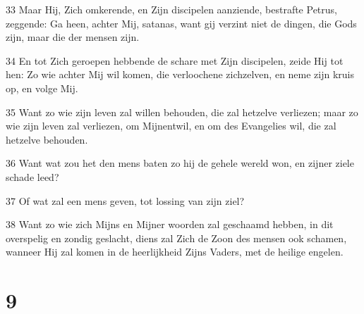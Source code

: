\par 33 Maar Hij, Zich omkerende, en Zijn discipelen aanziende, bestrafte Petrus, zeggende: Ga heen, achter Mij, satanas, want gij verzint niet de dingen, die Gods zijn, maar die der mensen zijn.
\par 34 En tot Zich geroepen hebbende de schare met Zijn discipelen, zeide Hij tot hen: Zo wie achter Mij wil komen, die verloochene zichzelven, en neme zijn kruis op, en volge Mij.
\par 35 Want zo wie zijn leven zal willen behouden, die zal hetzelve verliezen; maar zo wie zijn leven zal verliezen, om Mijnentwil, en om des Evangelies wil, die zal hetzelve behouden.
\par 36 Want wat zou het den mens baten zo hij de gehele wereld won, en zijner ziele schade leed?
\par 37 Of wat zal een mens geven, tot lossing van zijn ziel?
\par 38 Want zo wie zich Mijns en Mijner woorden zal geschaamd hebben, in dit overspelig en zondig geslacht, diens zal Zich de Zoon des mensen ook schamen, wanneer Hij zal komen in de heerlijkheid Zijns Vaders, met de heilige engelen.

\chapter{9}

